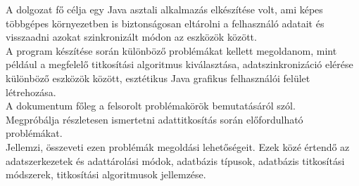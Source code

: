 
A dolgozat fő célja egy Java asztali alkalmazás elkészítése volt, ami képes többgépes környezetben is biztonságosan eltárolni a felhasználó adatait és visszaadni azokat szinkronizált módon az eszközök között.
\\ \indent A program készítése során különböző problémákat kellett megoldanom, mint például a megfelelő titkosítási algoritmus kiválasztása, adatszinkronizáció elérése különböző eszközök között, esztétikus Java grafikus felhasználói felület létrehozása.
\\ \indent A dokumentum főleg a felsorolt problémakörök bemutatásáról szól. 
\\ Megpróbálja részletesen ismertetni adattitkosítás során előfordulható problémákat. 
\\ Jellemzi, összeveti ezen problémák megoldási lehetőségeit. Ezek közé értendő az adatszerkezetek és adattárolási módok, adatbázis típusok, adatbázis titkosítási módszerek, titkosítási algoritmusok jellemzése. 
